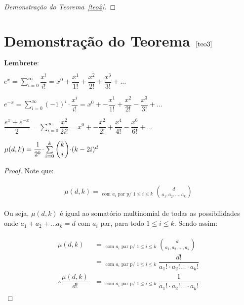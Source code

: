 \documentclass[12pt]{article}
\begin{document}
{\begin{proof}[Demonstração do Teorema~\ref{teo2}]
 \end{proof}
 
  \section{Demonstração do Teorema $\ref{teo3}$} \newl
 
 $\textbf{Lembrete:}$ \newl
 
 $e^x = \sum\limits_{i = 0}^{\infty}\dfrac{x^i}{i!} = x^0 + \dfrac{x^1}{1!} + \dfrac{x^2}{2!} + \dfrac{x^3}{3!} + \ldots$ \newl
 
  $e^{-x} = \sum\limits_{i = 0}^{\infty}(-1)^i {\cdot } \dfrac{ x^i}{i!} = x^0 +-\dfrac{x^1}{1!} + \dfrac{x^2}{2!} - \dfrac{x^3}{3!} + \ldots$ \newl
 
   $\dfrac{e^x + e^{-x}}{2} = \sum\limits_{i = 0}^{\infty}  \dfrac{ x^{2}}{2i!} = x^0 +-\dfrac{x^2}{2!} + \dfrac{x^4}{4!} - \dfrac{x^6}{6!} + \ldots$ \newl
   
  \vspace{5mm}
  
 \begin{lema}
 	\label{lema6}
 	$\mu(d, k) = \dfrac{1}{2^k} {\cdot} \sum\limits_{i = 0}^{k} \escolhe{k}{i} {\cdot} (k - 2i)^{d}$
 \end{lema}
 
 \begin{proof} 
 	Note que: \newl
 	
 	\begin{align}
 		\begin{split}
 			\mu(d, k) =  \mathop{\sum_{a_1 + a_2 + \ldots a_k = d}}_{\text{com $a_i$ par p/ $1 \leq i \leq k$}}\binom{d}{a_1, a_2, \ldots, a_k} 
 		\end{split} 
 	\end{align}
 	
 	Ou seja, $\mu(d, k)$ é igual ao somatório multinomial de todas as possibilidades onde $a_1 + a_2 + \ldots a_k = d$ com $a_i$ par, para todo $1 \leq i \leq k$. Sendo assim:
 	
 	\begin{align}
 		\begin{split}
 			\label{l6_1}
 			\mu(d, k) &=  \mathop{\sum_{a_1 + a_2 + \ldots a_k = d}}_{\text{com $a_i$ par p/ $1 \leq i \leq k$}}\binom{d}{a_1, a_2, \ldots, a_k} \\
 			&= \mathop{\sum_{a_1 + a_2 + \ldots a_k = d}}_{\text{com $a_i$ par p/ $1 \leq i \leq k$}}\dfrac{d!}{a_1! {\cdot} a_2! \ldots {\cdot} a_k!} \\
 			\therefore \dfrac{\mu(d, k)}{d!} &= \mathop{\sum_{a_1 + a_2 + \ldots a_k = 2}}_{\text{com $a_i$ par p/ $1 \leq i \leq k$}}\dfrac{1}{a_1! {\cdot} a_2! \ldots {\cdot} a_k!}
 		\end{split} 
 	\end{align}


\end{proof}}
\end{document}
